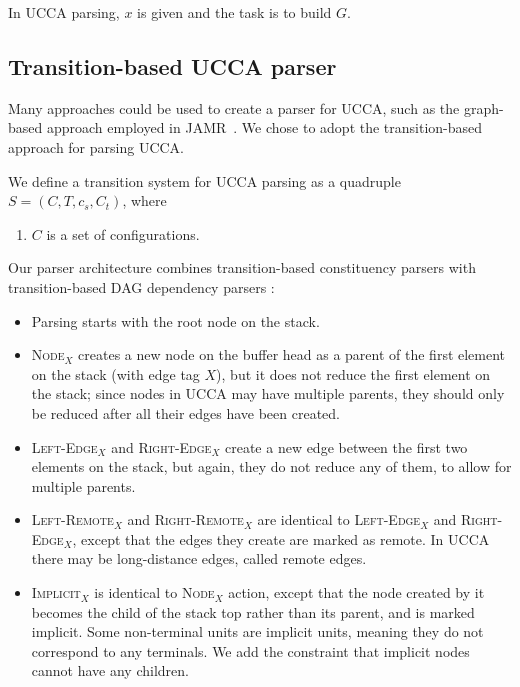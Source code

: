 \documentclass[11pt]{article}
\begin{document}
In UCCA parsing, $x$ is given and the task is to build $G$.

\subsection{Transition-based UCCA parser}

Many approaches could be used to create a parser for UCCA, such as the graph-based approach
employed in JAMR~\cite{flanigan2014discriminative}.
We chose to adopt the transition-based approach for parsing UCCA.

We define a transition system for UCCA parsing as a quadruple $S=(C,T,c_s,C_t)$, where
\begin{enumerate}
 \item $C$ is a set of configurations.
\end{enumerate}

Our parser architecture combines transition-based constituency parsers \cite{zhu2013fast,maier2015discontinuous} with transition-based DAG dependency parsers \cite{sagae2008shift,tokgoz2015transition}:

\begin{itemize}
	\item Parsing starts with the root node on the stack.
	\item \textsc{Node$_X$} creates a new node on the buffer head as a parent of the first element on the stack (with edge tag $X$), but it does not reduce the first element on the stack; since nodes in UCCA may have multiple parents, they should only be reduced after all their edges have been created.
	\item \textsc{Left-Edge$_X$} and \textsc{Right-Edge$_X$} create a new edge between the first two elements on the stack, but again, they do not reduce any of them, to allow for multiple parents.
	\item \textsc{Left-Remote$_X$} and \textsc{Right-Remote$_X$} are identical to \textsc{Left-Edge$_X$} and \textsc{Right-Edge$_X$}, except that the edges they create are marked as remote. In UCCA there may be long-distance edges, called remote edges.
	\item \textsc{Implicit$_X$} is identical to \textsc{Node$_X$} action, except that the node created by it becomes the child of the stack top rather than its parent, and is marked implicit. Some non-terminal units are implicit units, meaning they do not correspond to any terminals. We add the constraint that implicit nodes cannot have any children.
\end{itemize}
\end{document}
